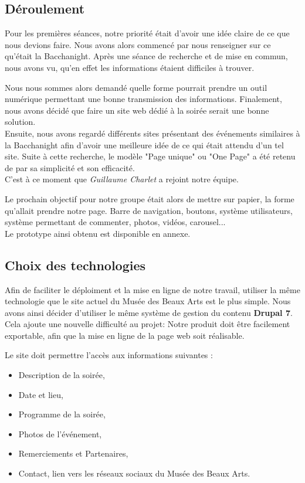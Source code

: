 \documentclass[11pt]{report}
\begin{document}
\subsection{Déroulement}

Pour les premières séances, notre priorité était d'avoir une idée claire
de ce que nous devions faire. Nous avons alors commencé par nous renseigner sur
ce qu'était la Bacchanight. Après une séance de recherche et de mise en commun,
nous avons vu, qu'en effet les informations étaient difficiles à trouver.
\par
Nous nous sommes alors demandé quelle forme pourrait prendre un outil numérique
permettant une bonne transmission des informations. Finalement, nous avons décidé
que faire un site web dédié à la soirée serait une bonne solution. \\
Ensuite, nous avons regardé différents sites présentant des événements similaires
à la Bacchanight afin d'avoir une meilleure idée de ce qui était attendu d'un
tel site. Suite à cette recherche, le modèle "Page unique" ou "One Page" a été
retenu de par sa simplicité et son efficacité. \\
C'est à ce moment que \textit{Guillaume Charlet} a rejoint notre équipe.
\par
Le prochain objectif pour notre groupe était alors de mettre sur papier,
la forme qu'allait prendre notre page. Barre de navigation, boutons,
système utilisateurs, système permettant de commenter, photos, vidéos, carousel... \\
Le prototype ainsi obtenu est disponible en annexe.

\subsection{Choix des technologies}

Afin de faciliter le déploiment et la mise en ligne de notre travail, utiliser la
même technologie que le site actuel du Musée des Beaux Arts est le plus simple.
Nous avons ainsi décider d'utiliser le même système de gestion du contenu
\textbf{Drupal 7}. \\
Cela ajoute une nouvelle difficulté au projet: Notre produit doit être facilement
exportable, afin que la mise en ligne de la page web soit réalisable.

Le site doit permettre l'accès aux informations suivantes :
\begin{itemize}
	\item Description de la soirée,
	\item Date et lieu,
	\item Programme de la soirée,
	\item Photos de l'événement,
	\item Remerciements et Partenaires,
	\item Contact, lien vers les réseaux sociaux du Musée des Beaux Arts.
\end{itemize}
\end{document}
